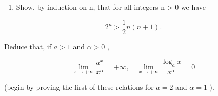 \begin{enumerate}
\def\labelenumi{\arabic{enumi})}
\setcounter{enumi}{1}
\tightlist
\item
  Show, by induction on n, that for all integers n \textgreater{} 0 we have
\end{enumerate}

\[
2 ^ {n} > \frac {1}{2} n (n + 1).
\]

Deduce that, if \(a > 1\) and \(\alpha > 0\) ,

\[
\lim _ {x \rightarrow + \infty} \frac {a ^ {x}}{x ^ {\alpha}} = + \infty , \quad \lim _ {x \rightarrow + \infty} \frac {\log_ {a} x}{x ^ {\alpha}} = 0
\]

(begin by proving the first of these relations for \(a = 2\) and \(\alpha = 1\) ).

